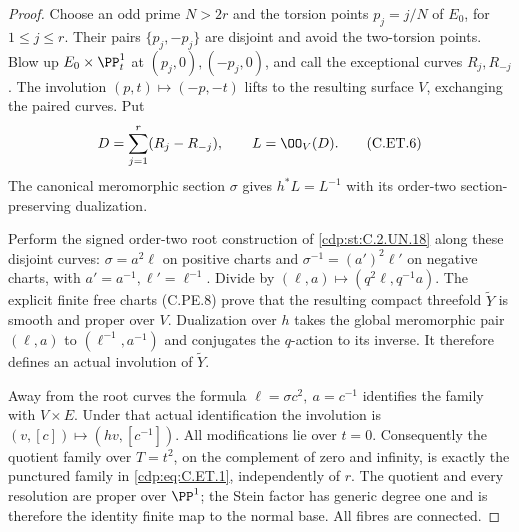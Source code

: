 \begin{proof}
Choose an odd prime $N>2r$ and the torsion
points $p_j=j/N$ of $E_0$, for $1\le j\le r$.
Their pairs $\{p_j,-p_j\}$ are disjoint and
avoid the two-torsion points. Blow up
$E_0\times\PP^1_t$ at $(p_j,0),(-p_j,0)$,
and call the exceptional curves $R_j,R_{-j}$.
The involution $(p,t)\mapsto(-p,-t)$ lifts
to the resulting surface $V$, exchanging
the paired curves. Put
\[
       D=\sum_{j=1}^r(R_j-R_{-j}),\qquad L=\OO_V(D).
                                                               \tag{C.ET.6}\label{cdp:eq:C.ET.6}
\]
The canonical meromorphic section $\sigma$
gives $h^*L=L^{-1}$ with its order-two
section-preserving dualization.

Perform the signed order-two root construction
of \ref{cdp:st:C.2.UN.18} along these disjoint curves:
$\sigma=a^2\ell$ on positive charts and
$\sigma^{-1}=(a')^2\ell'$ on negative charts,
with $a'=a^{-1},\ell'=\ell^{-1}$.
Divide by $(\ell,a)\mapsto(q^2\ell,q^{-1}a)$.
The explicit finite free charts (C.PE.8)
prove that the resulting compact threefold
$\widetilde Y$ is smooth and proper over $V$.
Dualization over $h$ takes the global
meromorphic pair $(\ell,a)$ to
$(\ell^{-1},a^{-1})$ and conjugates the
$q$-action to its inverse. It therefore
defines an actual involution of
$\widetilde Y$.

Away from the root curves the formula
$\ell=\sigma c^2,\ a=c^{-1}$ identifies the
family with $V\times E$. Under that actual
identification the involution is
$(v,[c])\mapsto(hv,[c^{-1}])$.
All modifications lie over $t=0$.
Consequently the quotient family over
$T=t^2$, on the complement of zero and
infinity, is exactly the punctured family
in \eqref{cdp:eq:C.ET.1}, independently of $r$.
The quotient and every resolution are proper over
$\PP^1$; the Stein factor has generic degree one
and is therefore the identity finite map to the
normal base. All fibres are connected.


\end{proof}
